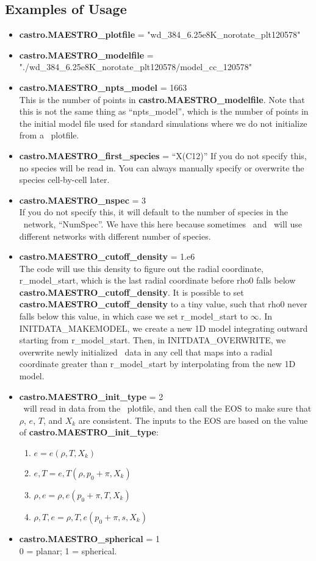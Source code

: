 \subsection{Examples of Usage}
\begin{itemize}
\item {\bf castro.MAESTRO\_plotfile} = "wd\_384\_6.25e8K\_norotate\_plt120578"
\item {\bf castro.MAESTRO\_modelfile} = "./wd\_384\_6.25e8K\_norotate\_plt120578/model\_cc\_120578"
\item {\bf castro.MAESTRO\_npts\_model} = 1663\\ This is the number of
  points in {\bf castro.MAESTRO\_modelfile}.  Note that this is not
  the same thing as ``npts\_model'', which is the number of points in
  the initial model file used for standard simulations where we do not
  initialize from a \maestro\ plotfile.
\item {\bf castro.MAESTRO\_first\_species} = ``X(C12)'' If you do not
  specify this, no species will be read in.  You can always manually
  specify or overwrite the species cell-by-cell later.
\item {\bf castro.MAESTRO\_nspec} = 3\\ If you do not specify this, it
  will default to the number of species in the \castro\ network,
  ``NumSpec''.  We have this here because sometimes \maestro\ and \castro\
  will use different networks with different number of species.
\item {\bf castro.MAESTRO\_cutoff\_density} = 1.e6\\ The code will use
  this density to figure out the radial coordinate, r\_model\_start,
  which is the last radial coordinate before rho0 falls below {\bf
    castro.MAESTRO\_cutoff\_density}.  It is possible to set {\bf
    castro.MAESTRO\_cutoff\_density} to a tiny value, such that rho0
  never falls below this value, in which case we set r\_model\_start
  to $\infty$.  In INITDATA\_MAKEMODEL, we create a new 1D model
  integrating outward starting from r\_model\_start.  Then, in
  INITDATA\_OVERWRITE, we overwrite newly initialized \castro\ data in
  any cell that maps into a radial coordinate greater than
  r\_model\_start by interpolating from the new 1D model.
\item {\bf castro.MAESTRO\_init\_type} = 2\\ \castro\ will read in data
  from the \maestro\ plotfile, and then call the EOS to make sure that
  $\rho$, $e$, $T$, and $X_k$ are consistent.  The inputs to the EOS
  are based on the value of {\bf castro.MAESTRO\_init\_type}:
\begin{enumerate}
\item $e = e(\rho,T,X_k)$
\item $e,T = e,T(\rho,p_0+\pi,X_k)$
\item $\rho,e = \rho,e(p_0+\pi,T,X_k)$
\item $\rho,T,e = \rho,T,e(p_0+\pi,s,X_k)$
\end{enumerate}
\item {\bf castro.MAESTRO\_spherical} = 1\\
0 = planar; 1 = spherical.
\end{itemize}

